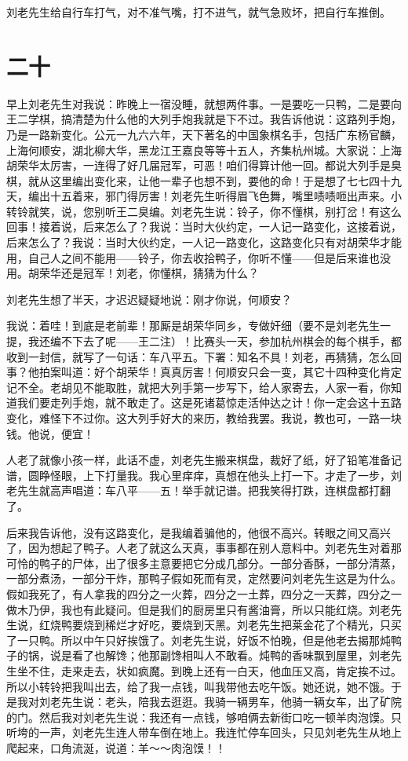 刘老先生给自行车打气，对不准气嘴，打不进气，就气急败坏，把自行车推倒。

\section{二十}

早上刘老先生对我说：昨晚上一宿没睡，就想两件事。一是要吃一只鸭，二是要向王二学棋，搞清楚为什么他的大列手炮我就是下不过。我告诉他说：这路列手炮，乃是一路新变化。公元一九六六年，天下著名的中国象棋名手，包括广东杨官麟，上海何顺安，湖北柳大华，黑龙江王嘉良等等十五人，齐集杭州城。大家说：上海胡荣华太厉害，一连得了好几届冠军，可恶！咱们得算计他一回。都说大列手是臭棋，就从这里编出变化来，让他一辈子也想不到，要他的命！于是想了七七四十九天，编出十五着来，邪门得厉害！刘老先生听得眉飞色舞，嘴里啧啧咂出声来。小转铃就笑，说，您别听王二臭编。刘老先生说：铃子，你不懂棋，别打岔！有这么回事！接着说，后来怎么了？我说：当时大伙约定，一人记一路变化，这接着说，后来怎么了？我说：当时大伙约定，一人记一路变化，这路变化只有对胡荣华才能用，自己人之间不能用——铃子，你去收拾鸭子，你听不懂——但是后来谁也没用。胡荣华还是冠军！刘老，你懂棋，猜猜为什么？ 

刘老先生想了半天，才迟迟疑疑地说：刚才你说，何顺安？ 

我说：着哇！到底是老前辈！那厮是胡荣华同乡，专做奸细（要不是刘老先生一提，我还编不下去了呢——王二注）！比赛头一天，参加杭州棋会的每个棋手，都收到一封信，就写了一句话：车八平五。下署：知名不具！刘老，再猜猜，怎么回事？他拍案叫道：好个胡荣华！真真厉害！何顺安只会一变，其它十四种变化肯定记不全。老胡见不能取胜，就把大列手第一步写下，给人家寄去，人家一看，你知道我们要走列手炮，就不敢走了。这是死诸葛惊走活仲达之计！你一定会这十五路变化，难怪下不过你。这大列手好大的来历，教给我罢。我说，教也可，一路一块钱。他说，便宜！ 


人老了就像小孩一样，此话不虚，刘老先生搬来棋盘，裁好了纸，好了铅笔准备记谱，圆睁怪眼，上下打量我。我心里痒痒，真想在他头上打一下。才走了一步，刘老先生就高声唱道：车八平——五！举手就记谱。把我笑得打跌，连棋盘都打翻了。 

后来我告诉他，没有这路变化，是我编着骗他的，他很不高兴。转眼之间又高兴了，因为想起了鸭子。人老了就这么天真，事事都在别人意料中。刘老先生对着那可怜的鸭子的尸体，出了很多主意要把它分成几部分。一部分香酥，一部分清蒸，一部分煮汤，一部分干炸，那鸭子假如死而有灵，定然要问刘老先生这是为什么。假如我死了，有人拿我的四分之一火葬，四分之一土葬，四分之一天葬，四分之一做木乃伊，我也有此疑问。但是我们的厨房里只有酱油膏，所以只能红烧。刘老先生说，红烧鸭要烧到稀烂才好吃，要烧到天黑。刘老先生把莱金花了个精光，只买了一只鸭。所以中午只好挨饿了。刘老先生说，好饭不怕晚，但是他老去揭那炖鸭子的锅，说是看了也解馋；他那副馋相叫人不敢看。炖鸭的香味飘到屋里，刘老先生坐不住，走来走去，状如疯魔。到晚上还有一白天，他血压又高，肯定挨不过。所以小转铃把我叫出去，给了我一点钱，叫我带他去吃午饭。她还说，她不饿。于是我对刘老先生说：老头，陪我去逛逛。我骑一辆男车，他骑一辆女车，出了矿院的门。然后我对刘老先生说：我还有一点钱，够咱俩去新街口吃一顿羊肉泡馍。只听垮的一声，刘老先生连人带车倒在地上。我连忙停车回头，只见刘老先生从地上爬起来，口角流涎，说道：羊～～肉泡馍！！ 

